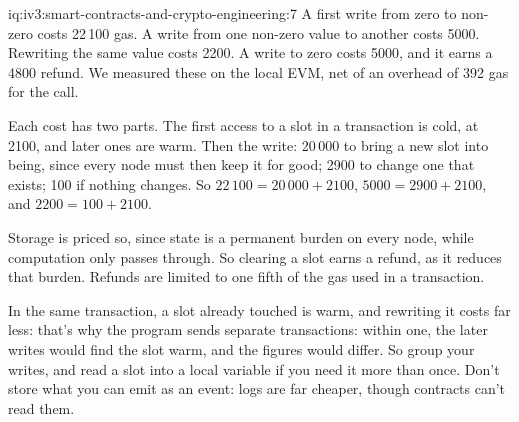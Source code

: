 \begin{solution}{iq:iv3:smart-contracts-and-crypto-engineering:7}
A first write from zero to non-zero costs 22\,100 gas. A write from one non-zero value to another costs 5000. Rewriting the same value costs 2200. A write to zero costs 5000, and it earns a 4800 refund. We measured these on the local EVM, net of an overhead of 392 gas for the call.

Each cost has two parts. The first access to a slot in a transaction is cold, at 2100, and later ones are warm. Then the write: 20\,000 to bring a new slot into being, since every node must then keep it for good; 2900 to change one that exists; 100 if nothing changes. So $22\,100 = 20\,000 + 2100$, $5000 = 2900 + 2100$, and $2200 = 100 + 2100$.

Storage is priced so, since state is a permanent burden on every node, while computation only passes through. So clearing a slot earns a refund, as it reduces that burden. Refunds are limited to one fifth of the gas used in a transaction.

In the same transaction, a slot already touched is warm, and rewriting it costs far less: that's why the program sends separate transactions: within one, the later writes would find the slot warm, and the figures would differ. So group your writes, and read a slot into a local variable if you need it more than once. Don't store what you can emit as an event: logs are far cheaper, though contracts can't read them.

\end{solution}

